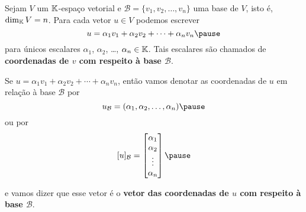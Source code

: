 \documentclass{beamer}
\begin{document}
\begin{frame}
  \begin{definicao}
    Sejam $V$ um $\mathbb{K}$-espaço vetorial \pause e $\mathcal{B} = \{v_1, v_2, \dots, v_n\}$ uma base de $V$, \pause isto é, $\dim_{\mathbb{K}}V = n$. \pause Para cada vetor $u \in V$ \pause podemos escrever
    \[
      u = \alpha_1v_1 + \alpha_2v_2 + \cdots + \alpha_nv_n\pause
    \]
    para únicos escalares \pause $\alpha_1$, $\alpha_2$, \dots, $\alpha_n \in \mathbb{K}$. \pause Tais escalares são chamados de \textbf{coordenadas de $v$ com respeito à base $\mathcal{B}$}.\pause
  \end{definicao}
\end{frame}

\begin{frame}
  \begin{notacao}
    Se $u = \alpha_1v_1 + \alpha_2v_2 + \cdots + \alpha_nv_n$, \pause então vamos denotar as coordenadas de $u$ \pause em relação à base $\mathcal{B}$ por\pause
    \[
      u_\mathcal{B} = (\alpha_1, \alpha_2, \dots, \alpha_n)\pause
    \]
    ou por
    \[
      [u]_\mathcal{B} = \begin{bmatrix}\alpha_1\\\alpha_2\\ \vdots\\ \alpha_n\end{bmatrix}\pause
    \]

    e vamos dizer que esse vetor \pause é o \textbf{vetor das coordenadas de $u$ com respeito à base $\mathcal{B}$}.
  \end{notacao}
\end{frame}
\end{document}
